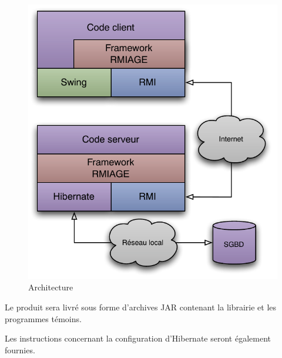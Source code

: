 \begin{figure}[htbp]
	\centering
		\includegraphics[scale=1]{../diagrammes/architecture.pdf}
	\caption{Architecture}
	\label{fig:archi}
\end{figure}

Le produit sera livré sous forme d'archives JAR contenant la librairie et les programmes témoins.

Les instructions concernant la configuration d'Hibernate seront également fournies.


